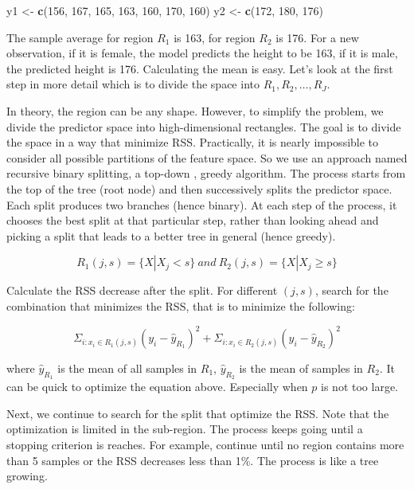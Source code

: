 \documentclass[12pt,]{krantz}
\makeatletter
\newenvironment{Shaded}{\begin{snugshade}}{\end{snugshade}}
\newcommand{\DecValTok}[1]{\textcolor[rgb]{0.06,0.06,0.06}{#1}}
\newcommand{\KeywordTok}[1]{\textcolor[rgb]{0.27,0.27,0.27}{\textbf{#1}}}
\newcommand{\NormalTok}[1]{#1}
\newcommand{\StringTok}[1]{\textcolor[rgb]{0.5,0.5,0.5}{#1}}
\newenvironment{kframe}{%
\medskip{}
\setlength{\fboxsep}{.8em}
 \def\at@end@of@kframe{}%
 \ifinner\ifhmode%
  \def\at@end@of@kframe{\end{minipage}}%
  \begin{minipage}{\columnwidth}%
 \fi\fi%
 \def\FrameCommand##1{\hskip\@totalleftmargin \hskip-\fboxsep
 \colorbox{shadecolor}{##1}\hskip-\fboxsep
     \hskip-\linewidth \hskip-\@totalleftmargin \hskip\columnwidth}%
 \MakeFramed {\advance\hsize-\width
   \@totalleftmargin\z@ \linewidth\hsize
   \@setminipage}}%
 {\par\unskip\endMakeFramed%
 \at@end@of@kframe}
\renewenvironment{Shaded}{\begin{kframe}}{\end{kframe}}
\makeatother
\begin{document}
\begin{Shaded}
\begin{Highlighting}[]
\NormalTok{y1 <-}\StringTok{ }\KeywordTok{c}\NormalTok{(}\DecValTok{156}\NormalTok{, }\DecValTok{167}\NormalTok{, }\DecValTok{165}\NormalTok{, }\DecValTok{163}\NormalTok{, }\DecValTok{160}\NormalTok{, }\DecValTok{170}\NormalTok{, }\DecValTok{160}\NormalTok{)}
\NormalTok{y2 <-}\StringTok{ }\KeywordTok{c}\NormalTok{(}\DecValTok{172}\NormalTok{, }\DecValTok{180}\NormalTok{, }\DecValTok{176}\NormalTok{)}
\end{Highlighting}
\end{Shaded}

The sample average for region \(R_1\) is 163, for region \(R_2\) is 176. For a new observation, if it is female, the model predicts the height to be 163, if it is male, the predicted height is 176. Calculating the mean is easy. Let's look at the first step in more detail which is to divide the space into \(R_1, R_2, \dots, R_J\).

In theory, the region can be any shape. However, to simplify the problem, we divide the predictor space into high-dimensional rectangles. The goal is to divide the space in a way that minimize RSS. Practically, it is nearly impossible to consider all possible partitions of the feature space. So we use an approach named recursive binary splitting, a top-down , greedy algorithm. The process starts from the top of the tree (root node) and then successively splits the predictor space. Each split produces two branches (hence binary). At each step of the process, it chooses the best split at that particular step, rather than looking ahead and picking a split that leads to a better tree in general (hence greedy).

\[R_{1}(j, s)=\{X|X_j<s\}\ and\ R_{2}(j, s)=\{X|X_j\geq s\}\]

Calculate the RSS decrease after the split. For different \((j,s)\), search for the combination that minimizes the RSS, that is to minimize the following:

\[\Sigma_{i:x_i\in R_1(j,s)}(y_i-\hat{y}_{R_{1}})^2+\Sigma_{i:x_i\in R_2(j,s)}(y_i-\hat{y}_{R_{2}})^2\]

where \(\hat{y}_{R_1}\) is the mean of all samples in \(R_1\), \(\hat{y}_{R_2}\) is the mean of samples in \(R_2\). It can be quick to optimize the equation above. Especially when \(p\) is not too large.

Next, we continue to search for the split that optimize the RSS. Note that the optimization is limited in the sub-region. The process keeps going until a stopping criterion is reaches. For example, continue until no region contains more than 5 samples or the RSS decreases less than 1\%. The process is like a tree growing.
\end{document}
